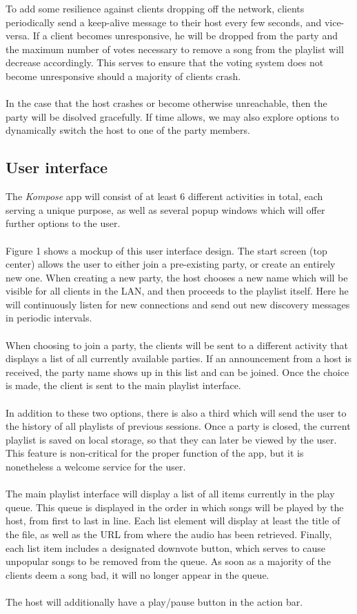 \documentclass{report}
\begin{document}
%
To add some resilience against clients dropping off the network, clients periodically 
send a keep-alive message to their host every few seconds, and vice-versa.
If a client becomes unresponsive, he will be dropped from the party and the maximum number of votes
necessary to remove a song from the playlist will decrease accordingly. This serves to
ensure that the voting system does not become unresponsive should a majority of clients crash.\\\\
%
In the case that the host crashes or become otherwise unreachable, then the party will be 
disolved gracefully. If time allows, we may also explore options to dynamically switch 
the host to one of the party members.
%

\subsection{User interface}
The \emph{Kompose} app will consist of at least 6 different activities in total, 
each serving a unique purpose, as well as several popup windows which will offer 
further options to the user. \\\\
%
Figure 1 shows a mockup of this user interface design. The start screen
(top center) allows the user to either join a pre-existing party, or 
create an entirely new one. When creating a new party, the host chooses 
a new name which will be visible for all clients in the LAN, and then
proceeds to the playlist itself. Here he will continuously listen for new
connections and send out new discovery messages in periodic intervals. \\\\
%
When choosing to join a party, the clients will be sent to a different
activity that displays a list of all currently available parties.
If an announcement from a host is received, the party name shows up in 
this list and can be joined. Once the choice is made, the client is sent
to the main playlist interface. \\\\
%
In addition to these two options, there is also a third which will send 
the user to the history of all playlists of previous sessions.
Once a party is closed, the current playlist is saved on local storage,
so that they can later be viewed by the user. This feature is non-critical 
for the proper function of the app, but it is nonetheless a welcome service
for the user. \\\\
%
The main playlist interface will display a list of all items currently in 
the play queue. This queue is displayed in the order in which songs will be 
played by the host, from first to last in line. Each list element will display 
at least the title of the file, as well as the URL from where the audio has 
been retrieved. Finally, each list item includes a designated downvote button,
which serves to cause unpopular songs to be removed from the queue. As soon as 
a majority of the clients deem a song bad, it will no longer appear in the queue. \\\\
%
The host will additionally have a play/pause button in the action bar.
\end{document}
